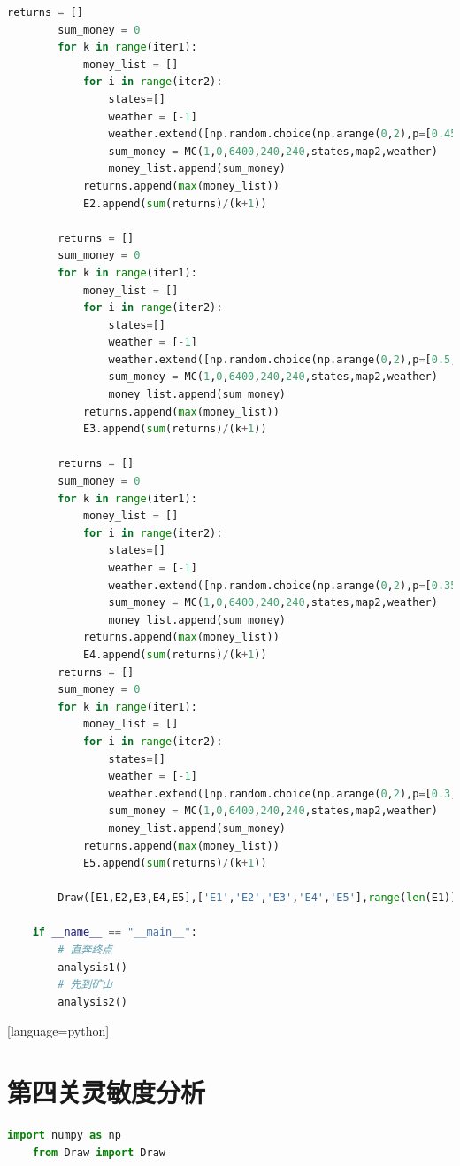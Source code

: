 \documentclass[withoutpreface,bwprint]{cumcmthesis} %
\begin{document}
\begin{appendices}
\begin{lstlisting}[language=python]
        returns = []
        sum_money = 0
        for k in range(iter1):
            money_list = []
            for i in range(iter2):
                states=[]
                weather = [-1]
                weather.extend([np.random.choice(np.arange(0,2),p=[0.45,0.55]) for _ in range(10)])
                sum_money = MC(1,0,6400,240,240,states,map2,weather)
                money_list.append(sum_money)
            returns.append(max(money_list))
            E2.append(sum(returns)/(k+1))
    
        returns = []
        sum_money = 0
        for k in range(iter1):
            money_list = []
            for i in range(iter2):
                states=[]
                weather = [-1]
                weather.extend([np.random.choice(np.arange(0,2),p=[0.5,0.5]) for _ in range(10)])
                sum_money = MC(1,0,6400,240,240,states,map2,weather)
                money_list.append(sum_money)
            returns.append(max(money_list))
            E3.append(sum(returns)/(k+1))
    
        returns = []
        sum_money = 0
        for k in range(iter1):
            money_list = []
            for i in range(iter2):
                states=[]
                weather = [-1]
                weather.extend([np.random.choice(np.arange(0,2),p=[0.35,0.65]) for _ in range(10)])
                sum_money = MC(1,0,6400,240,240,states,map2,weather)
                money_list.append(sum_money)
            returns.append(max(money_list))
            E4.append(sum(returns)/(k+1))
        returns = []
        sum_money = 0
        for k in range(iter1):
            money_list = []
            for i in range(iter2):
                states=[]
                weather = [-1]
                weather.extend([np.random.choice(np.arange(0,2),p=[0.3,0.7]) for _ in range(10)])
                sum_money = MC(1,0,6400,240,240,states,map2,weather)
                money_list.append(sum_money)
            returns.append(max(money_list))
            E5.append(sum(returns)/(k+1))
    
        Draw([E1,E2,E3,E4,E5],['E1','E2','E3','E4','E5'],range(len(E1)),"")
    
    if __name__ == "__main__":
        # 直奔终点
        analysis1()
        # 先到矿山
        analysis2()    
\end{lstlisting}[language=python]

\section{第四关灵敏度分析}
\begin{lstlisting}[language=python]
    import numpy as np
    from Draw import Draw
    

\end{lstlisting}
\end{appendices}
\end{document}

